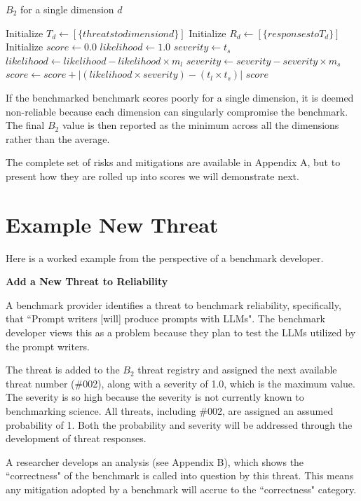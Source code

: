 \documentclass{article}
\newcommand\bb{$B_2$ }
\begin{document}
\begin{algorithm}
\label{alg:b2}
\caption{\bb for a single dimension $d$}
\begin{algorithmic}[1]
\State Initialize $T_d \gets [ \{ threats to dimension d \} ]$
\State Initialize $R_d \gets [ \{ responses to T_d \} ]$
\State Initialize $score \gets 0.0$
    \State $likelihood \gets 1.0$
    \State $severity \gets t_s$
        \State $likelihood \gets likelihood - likelihood \times m_l$
        \State $severity \gets severity - severity \times m_s$
    \EndFor
    \State $score \gets score + |(likelihood\times severity) - (t_l\times t_s)|$
\EndFor
\State \Return $score$
\end{algorithmic}
\end{algorithm}

If the benchmarked benchmark scores poorly for a single dimension, it is deemed non-reliable because each dimension can singularly compromise the benchmark. The final \bb value is then reported as the minimum across all the dimensions rather than the average.

The complete set of risks and mitigations are available in Appendix A, but to present how they are rolled up into scores we will demonstrate next.
\section{Example New Threat}
Here is a worked example from the perspective of a benchmark developer.

\textbf{Add a New Threat to Reliability}

A benchmark provider identifies a threat to benchmark reliability, specifically, that ``Prompt writers [will] produce prompts with LLMs". The benchmark developer views this as a problem because they plan to test the LLMs utilized by the prompt writers.

The threat is added to the \bb threat registry and assigned the next available threat number (\#002), along with a severity of 1.0, which is the maximum value. The severity is so high because the severity is not currently known to benchmarking science. All threats, including \#002, are assigned an assumed probability of 1. Both the probability and severity will be addressed through the development of threat responses.

A researcher develops an analysis (see Appendix B), which shows the ``correctness" of the benchmark is called into question by this threat. This means any mitigation adopted by a benchmark will accrue to the ``correctness" category.
\end{document}
